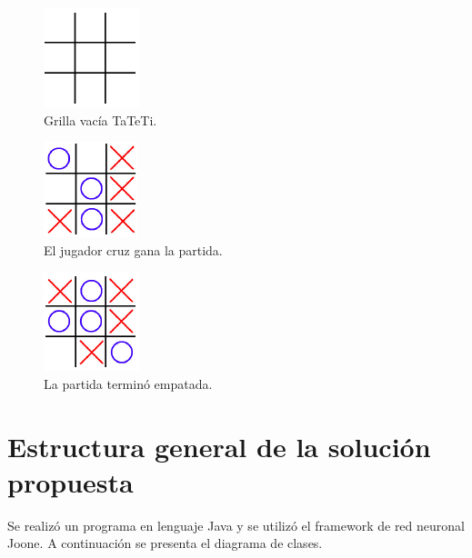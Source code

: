 \documentclass[12pt,titlepage]{article}
\begin{document}
\begin{figure}[h!]
 \centering
 \includegraphics{./imgs/grilla-tateti.png}
 \caption{Grilla vac\'ia TaTeTi.}
 \label{grilla-vacia}
\end{figure}

\begin{figure}[h!]
 \centering
 \includegraphics{./imgs/cruz-gana-tateti.png}
 \caption{El jugador cruz gana la partida.}
 \label{cruz-gana}
\end{figure}

\begin{figure}[h!]
 \centering
 \includegraphics{./imgs/empate-tateti.png}
 \caption{La partida termin\'o empatada.}
 \label{empate-tateti}
\end{figure}

\section{Estructura general de la soluci\'on propuesta}
Se realiz\'o un programa en lenguaje Java y se utiliz\'o el framework de red neuronal Joone. A continuaci\'on se presenta el diagrama de clases.
\end{document}
